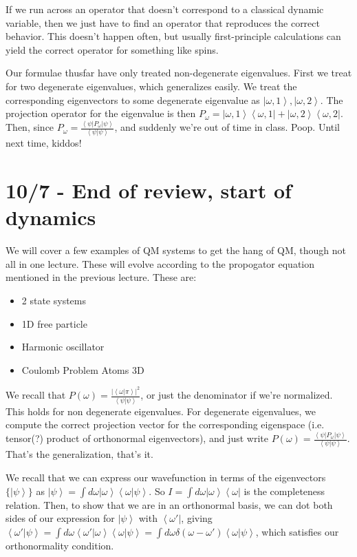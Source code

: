 \documentclass[10pt]{report}
\newcommand{\bra}[1]{\left<#1\right|}
\newcommand{\ket}[1]{\left|#1\right>}
\newcommand{\dotp}[2]{\left<#1\left.\right|#2\right>}
\newcommand{\abs}[1]{\left|#1\right|}
\begin{document}
If we run across an operator that doesn't correspond to a classical dynamic variable, then we just have to find an operator that reproduces the correct behavior. This doesn't happen often, but usually first-principle calculations can yield the correct operator for something like spins. 

Our formulae thusfar have only treated non-degenerate eigenvalues. First we treat for two degenerate eigenvalues, which generalizes easily. We treat the corresponding eigenvectors to some degenerate eigenvalue as $\ket{\omega,1},\ket{\omega,2}$. The projection operator for the eigenvalue is then $P_\omega=\ket{\omega,1}\bra{\omega,1} + \ket{\omega,2}\bra{\omega,2}$. Then, since $P_\omega=\frac{\bra{\psi}P_\omega\ket{\psi}}{\dotp{\psi}{\psi}}$, and suddenly we're out of time in class. Poop. Until next time, kiddos!

\chapter{10/7 - End of review, start of dynamics}

We will cover a few examples of QM systems to get the hang of QM, though not all in one lecture. These will evolve according to the propogator equation mentioned in the previous lecture. These are:
\begin{itemize}
	\item 2 state systems
	\item 1D free particle
	\item Harmonic oscillator
	\item Coulomb Problem Atoms 3D
\end{itemize}
We recall that $P(\omega)=\frac{\abs{\dotp{\omega}{\pi}}^2}{\dotp{\psi}{\psi}}$, or just the denominator if we're normalized. This holds for non degenerate eigenvalues. For degenerate eigenvalues, we compute the correct projection vector for the corresponding eigenspace (i.e. tensor(?) product of orthonormal eigenvectors), and just write $P(\omega)=\frac{\bra{\psi}P_\omega\ket{\psi}}{\dotp{\psi}{\psi}}$. That's the generalization, that's it.

We recall that we can express our wavefunction in terms of the eigenvectors $\{\ket{\psi}\}$ as $\ket{\psi} = \int d\omega \ket{\omega}\dotp{\omega}{\psi}$. So $I = \int d \omega\ket{\omega}\bra{\omega}$ is the completeness relation. Then, to show that we are in an orthonormal basis, we can dot both sides of our expression for $\ket{\psi}$ with $\bra{\omega'}$, giving $\dotp{\omega'}{\psi} = \int d\omega\dotp{\omega'}{\omega}\dotp{\omega}{\psi} = \int d\omega\delta(\omega-\omega')\dotp{\omega}{\psi}$, which satisfies our orthonormality condition.
\end{document}
